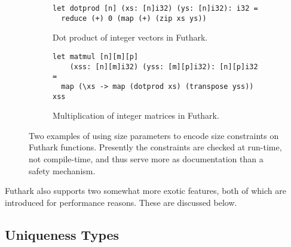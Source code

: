 \begin{figure}
  \centering
  \begin{subfigure}{1\textwidth}
    \begin{lstlisting}
let dotprod [n] (xs: [n]i32) (ys: [n]i32): i32 =
  reduce (+) 0 (map (+) (zip xs ys))
\end{lstlisting}
    \caption{Dot product of integer vectors in Futhark.}
    \label{fig:futhark-dotprod}
  \end{subfigure}
\par\bigskip
  \begin{subfigure}{1\textwidth}
\begin{lstlisting}
let matmul [n][m][p]
    (xss: [n][m]i32) (yss: [m][p]i32): [n][p]i32 =
  map (\xs -> map (dotprod xs) (transpose yss)) xss
\end{lstlisting}
    \caption{Multiplication of integer matrices in Futhark.}
    \label{fig:futhark-matmult}
  \end{subfigure}

  \caption{Two examples of using size parameters to encode size constraints on Futhark functions.  Presently the constraints are checked at run-time, not compile-time, and thus serve more as documentation than a safety mechanism.}
  \label{fig:futhark-size-parameters}
\end{figure}

Futhark also supports two somewhat more exotic features, both of which
are introduced for performance reasons.  These are discussed below.

\subsection{Uniqueness Types}
\label{sec:uniqueness-types}

